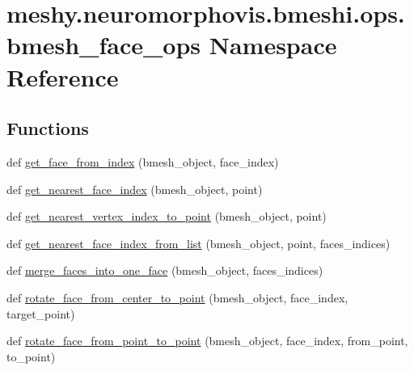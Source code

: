 \hypertarget{namespacemeshy_1_1neuromorphovis_1_1bmeshi_1_1ops_1_1bmesh__face__ops}{}\section{meshy.\+neuromorphovis.\+bmeshi.\+ops.\+bmesh\+\_\+face\+\_\+ops Namespace Reference}
\label{namespacemeshy_1_1neuromorphovis_1_1bmeshi_1_1ops_1_1bmesh__face__ops}
\subsection*{Functions}
\begin{DoxyCompactItemize}
\item 
def \hyperlink{namespacemeshy_1_1neuromorphovis_1_1bmeshi_1_1ops_1_1bmesh__face__ops_a766247f479f75be2b8c34a1e022c1090}{get\+\_\+face\+\_\+from\+\_\+index} (bmesh\+\_\+object, face\+\_\+index)
\item 
def \hyperlink{namespacemeshy_1_1neuromorphovis_1_1bmeshi_1_1ops_1_1bmesh__face__ops_a69236543465971a9707a88c714c45ae0}{get\+\_\+nearest\+\_\+face\+\_\+index} (bmesh\+\_\+object, point)
\item 
def \hyperlink{namespacemeshy_1_1neuromorphovis_1_1bmeshi_1_1ops_1_1bmesh__face__ops_ab3d628812d8df46ff5f291809d5f2ba9}{get\+\_\+nearest\+\_\+vertex\+\_\+index\+\_\+to\+\_\+point} (bmesh\+\_\+object, point)
\item 
def \hyperlink{namespacemeshy_1_1neuromorphovis_1_1bmeshi_1_1ops_1_1bmesh__face__ops_a1f5fbaaff244f742a8976afd22c12e39}{get\+\_\+nearest\+\_\+face\+\_\+index\+\_\+from\+\_\+list} (bmesh\+\_\+object, point, faces\+\_\+indices)
\item 
def \hyperlink{namespacemeshy_1_1neuromorphovis_1_1bmeshi_1_1ops_1_1bmesh__face__ops_a63016519c72ebc56778c07463b3049c1}{merge\+\_\+faces\+\_\+into\+\_\+one\+\_\+face} (bmesh\+\_\+object, faces\+\_\+indices)
\item 
def \hyperlink{namespacemeshy_1_1neuromorphovis_1_1bmeshi_1_1ops_1_1bmesh__face__ops_a2c9f32691e12d675a0e78af5310fb478}{rotate\+\_\+face\+\_\+from\+\_\+center\+\_\+to\+\_\+point} (bmesh\+\_\+object, face\+\_\+index, target\+\_\+point)
\item 
def \hyperlink{namespacemeshy_1_1neuromorphovis_1_1bmeshi_1_1ops_1_1bmesh__face__ops_a1c12ec832c0bdc85a746a4f2b078f55d}{rotate\+\_\+face\+\_\+from\+\_\+point\+\_\+to\+\_\+point} (bmesh\+\_\+object, face\+\_\+index, from\+\_\+point, to\+\_\+point)

\end{DoxyCompactItemize}
